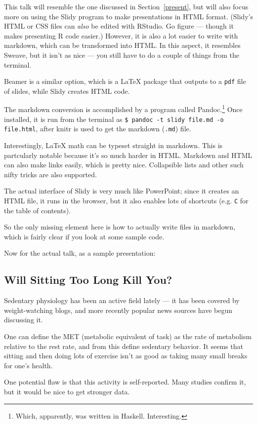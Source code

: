 This talk will resemble the one discussed in Section~\ref{present}, but will also focus more on using the Slidy program to make presentations in HTML format. (Slidy's HTML or CSS files can \emph{also} be edited with RStudio. Go figure --- though it makes presenting R code easier.) However, it is also a lot easier to write with markdown, which can be transformed into HTML. In this aspect, it resembles Sweave, but it isn't as nice --- you still have to do a couple of things from the terminal.

Beamer is a similar option, which is a \LaTeX{} package that outputs to a \texttt{pdf} file of slides, while Slidy creates HTML code.

The markdown conversion is accomplished by a program called Pandoc.\footnote{Which, apparently, was written in Haskell. Interesting.} Once installed, it is run from the terminal as \verb+$ pandoc -t slidy file.md -o file.html+, after knitr is used to %
get the markdown (\texttt{.md}) file.

Interestingly, \LaTeX{} math can be typeset straight in markdown. This is partcularly notable because it's so much harder in HTML. Markdown and HTML can also make links easily, which is pretty nice. Collapsible lists and other such nifty tricks are also supported.

The actual interface of Slidy is very much like PowerPoint; since it creates an HTML file, it runs in the browser, but it also enables lots of shortcuts (e.g. \texttt{C} for the table of contents).

So the only missing element here is how to actually write files in markdown, which is fairly clear if you look at some sample code.

Now for the actual talk, as a sample presentation:
\subsection*{Will Sitting Too Long Kill You?}
Sedentary physiology has been an active field lately --- it has been covered by weight-watching blogs, and more recently popular news sources have begun discussing it.

One can define the MET (metabolic equivalent of task) as the rate of metabolism relative to the rest rate, and from this define sedentary behavior. It seems that sitting and then doing lots of exercise isn't as good as taking many small breaks for one's health.

One potential flaw is that this activity is self-reported. Many studies confirm it, but it would be nice to get stronger data.

